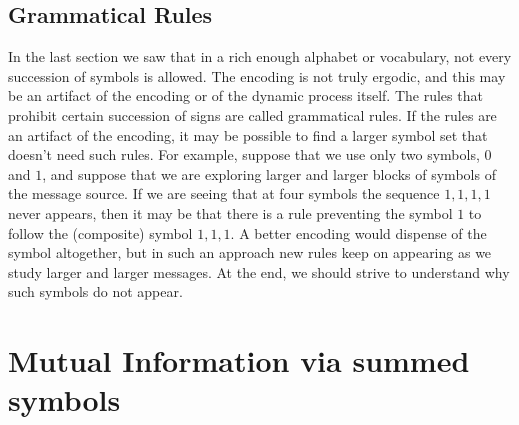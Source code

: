 \documentclass[10pt]{article}
\begin{document}
\subsection{Grammatical Rules}

In the last section we saw that in a rich enough alphabet or vocabulary,
not every succession of symbols is allowed.  The encoding is not truly
ergodic, and this may be an artifact of the encoding or of the
dynamic process itself. The rules that prohibit certain succession of signs
are called grammatical rules. If the rules are an artifact of the encoding,
it may be possible to find a larger symbol set that doesn't need such
rules. For example, suppose that we use only two symbols, $0$ and $1$,
and suppose that we are exploring larger and larger blocks of symbols of
the message source.  If we are seeing  that at four symbols
the sequence $1,1,1,1$ never appears, then it may be that
there is a rule preventing the symbol $1$ to follow the
(composite) symbol $1,1,1$. A better encoding would dispense of the
symbol altogether, but in such an approach new rules keep on appearing as
we study larger and larger messages. At the end, we should strive to
understand why such symbols do not appear.

\section{Mutual Information via summed symbols}
\end{document}
